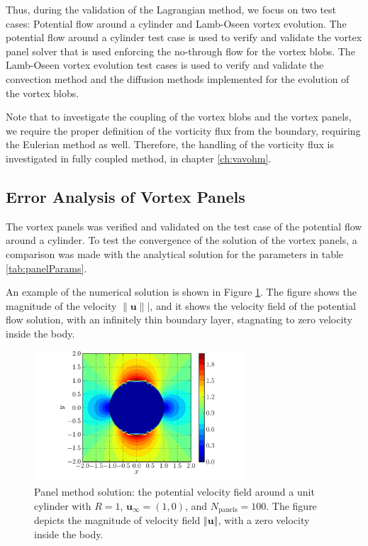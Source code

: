 Thus, during the validation of the Lagrangian method, we focus on two test cases: Potential flow around a cylinder and Lamb-Oseen vortex evolution. The potential flow around a cylinder test case is used to verify and validate the vortex panel solver that is used enforcing the no-through flow for the vortex blobs. The Lamb-Oseen vortex evolution test cases is used to verify and validate the convection method and the diffusion methods implemented for the evolution of the vortex blobs.

Note that to investigate the coupling of the vortex blobs and the vortex panels, we require the proper definition of the vorticity flux from the boundary, requiring the Eulerian method as well. Therefore, the handling of the vorticity flux is investigated in fully coupled method, in chapter \ref{ch:vavohm}.


\subsection{Error Analysis of Vortex Panels}


The vortex panels was verified and validated on the test case of the potential flow around a cylinder. To test the 
convergence of the solution of the vortex panels, a comparison was made with the analytical solution for the parameters in table \ref{tab:panelParams}.

An example of the numerical solution is shown in Figure \ref{fig:panelCylinder_velocityField}. The figure shows the magnitude of the velocity $\lVert\mathbf{u}\rVert|$, and it shows the velocity field of the potential flow solution, with an infinitely thin boundary layer, stagnating to zero velocity inside the body.

	\begin{figure}[p]
	\centering
	\includegraphics[width=0.7\textwidth]{figures/lagrangian/panelCylinder_velocityField.pdf}
	\caption{Panel method solution: the potential velocity field around a unit cylinder with $R = 1$, $\mathbf{u}_{\infty} = (1, 0)$, and $N_{\mathrm{panels}}=100$. The figure depicts the magnitude of velocity field $\left\Vert\mathbf{u}\right\Vert$, with a zero velocity inside the body.}
	\label{fig:panelCylinder_velocityField}
	\end{figure}

